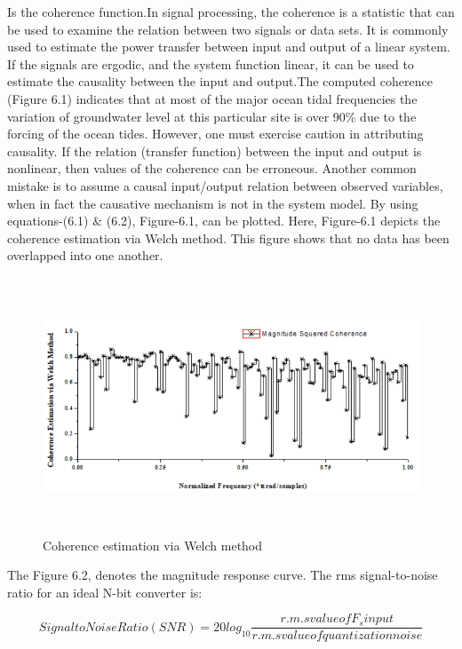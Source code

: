 Is the coherence function.In signal processing, the coherence is a statistic that can be used to examine the relation between two signals or data sets. It is commonly used to estimate the power transfer between input and output of a linear system. If the signals are ergodic, and the system function linear, it can be used to estimate the causality between the input and output.The computed coherence (Figure 6.1) indicates that at most of the major ocean tidal frequencies the variation of groundwater level at this particular site is over 90\% due to the forcing of the ocean tides. However, one must exercise caution in attributing causality. If the relation (transfer function) between the input and output is nonlinear, then values of the coherence can be erroneous. Another common mistake is to assume a causal input/output relation between observed variables, when in fact the causative mechanism is not in the system model. By using equations-(6.1) $\&$  (6.2), Figure-6.1, can be plotted. Here, Figure-6.1 depicts the coherence estimation via Welch method. This figure shows that no data has been overlapped into one another.
\begin{figure}[H]
	\begin{Center}
		\includegraphics[width=6.5in,height=3in]{15}
		\caption{ Coherence estimation via Welch method }
		\label{fig:_1_Coherence_estimation_via_Welch_method_}
	\end{Center}
\end{figure}
The Figure 6.2, denotes the magnitude response curve. The rms signal-to-noise ratio for an ideal N-bit converter is:\par


\begin{equation}\tag{7.3}
Signal to Noise Ratio (SNR) = 20log_{10}\frac{r.m.s value of F_{s} input}{r.m.s value of quantization noise}
\end{equation}

